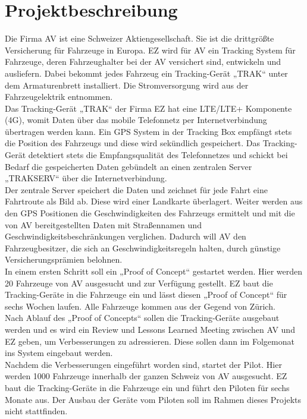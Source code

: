 \documentclass[a4paper,10pt]{scrartcl}
\begin{document}
\section{Projektbeschreibung}
Die Firma AV ist eine Schweizer Aktiengesellschaft. Sie ist die drittgrößte Versicherung für
Fahrzeuge in Europa. EZ wird für AV ein Tracking System für Fahrzeuge, deren Fahrzeughalter bei der AV versichert sind, entwickeln und ausliefern. Dabei bekommt jedes Fahrzeug
ein Tracking-Gerät „TRAK“ unter dem Armaturenbrett installiert. Die Stromversorgung
wird aus der Fahrzeugelektrik entnommen.\\
Das Tracking-Gerät „TRAK“ der Firma EZ hat eine LTE/LTE+ Komponente (4G), womit Daten über das mobile Telefonnetz per Internetverbindung übertragen werden kann. Ein GPS System in der Tracking Box empfängt stets die Position des Fahrzeugs und diese wird sekündlich gespeichert. Das Tracking-Gerät detektiert stets die Empfangsqualität des Telefonnetzes und schickt bei Bedarf die gespeicherten Daten gebündelt an einen zentralen Server „TRAKSERV“ über die Internetverbindung.\\
Der zentrale Server speichert die Daten und zeichnet für jede Fahrt eine Fahrtroute als Bild ab. Diese wird einer Landkarte überlagert. Weiter werden aus den GPS Positionen die Geschwindigkeiten des Fahrzeugs ermittelt und mit die von AV bereitgestellten Daten mit Straßennamen und Geschwindigkeitsbeschränkungen verglichen. Dadurch will AV den Fahrzeugbesitzer, die sich an Geschwindigkeitsregeln halten, durch günstige Versicherungsprämien belohnen.\\
In einem ersten Schritt soll ein „Proof of Concept“ gestartet werden. Hier werden 20 Fahrzeuge von AV ausgesucht und zur Verfügung gestellt. EZ baut die Tracking-Geräte in die Fahrzeuge ein und lässt diesen „Proof of Concept“ für sechs Wochen laufen. Alle Fahrzeuge kommen aus der Gegend von Zürich.\\
Nach Ablauf des „Proof of Concepts“ sollen die Tracking-Geräte ausgebaut werden und es wird ein Review und Lessons Learned Meeting zwischen AV und EZ geben, um Verbesserungen zu adressieren. Diese sollen dann im Folgemonat ins System eingebaut werden.\\
Nachdem die Verbesserungen eingeführt worden sind, startet der Pilot. Hier werden 1000 Fahrzeuge innerhalb der ganzen Schweiz von AV ausgesucht. EZ baut die Tracking-Geräte in die Fahrzeuge ein und führt den Piloten für sechs Monate aus. Der Ausbau der Geräte vom Piloten soll im Rahmen dieses Projekts nicht stattfinden.
\setcounter{page}{1}
\end{document}
